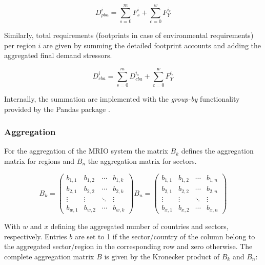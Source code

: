 \documentclass{jors}
\begin{document}
{\begin{equation}
    D_{pba}^i = \sum_{s=0}^m F^i_s + \sum_{c=0}^w F_Y^{i_c}
\end{equation}

Similarly, total requirements (footprints in case of environmental requirements) per region $i$ are given by summing the detailed footprint accounts and adding the aggregated final demand stressors.

\begin{equation}
    D_{cba}^i = \sum_{s=0}^m D_{cba}^{i_s} + \sum_{c=0}^w F_Y^{i_c}
\end{equation}

Internally, the summation are implemented with the \textit{group-by} functionality provided by the Pandas package \cite{mckinney2010_Data}.


\subsubsection*{Aggregation}

For the aggregation of the MRIO system the matrix $B_k$ defines
the aggregation matrix for regions and $B_n$ the aggregation matrix
for sectors.

\begin{equation}
    B_k =
    \begin{pmatrix}
      b_{1,1} & b_{1,2} & \cdots & b_{1,k} \\
      b_{2,1} & b_{2,2} & \cdots & b_{2,k} \\
      \vdots  & \vdots  & \ddots & \vdots  \\
      b_{w,1} & b_{w,2} & \cdots & b_{w,k}
    \end{pmatrix}
    B_n =
    \begin{pmatrix}
      b_{1,1} & b_{1,2} & \cdots & b_{1,n} \\
      b_{2,1} & b_{2,2} & \cdots & b_{2,n} \\
      \vdots  & \vdots  & \ddots & \vdots  \\
      b_{x,1} & b_{x,2} & \cdots & b_{x,n}
    \end{pmatrix}
\end{equation}

With $w$ and $x$ defining the aggregated number of countries and sectors,
respectively. Entries $b$ are set to 1 if the sector/country of the column
belong to the aggregated sector/region in the corresponding row and zero
otherwise. The complete aggregation matrix $B$ is given by the Kronecker
product of $B_k$ and $B_n$:

}
\end{document}
